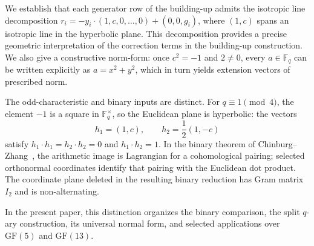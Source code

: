 \documentclass[12pt]{article}
\newcommand{\F}{\mathbb{F}}
\newcommand{\GF}[1]{\ensuremath{\mathrm{GF}(#1)}}
\begin{document}

We establish that each generator row of the building-up admits the isotropic line decomposition $r_i = -y_i \cdot (1, c, 0, \ldots, 0) + (0, 0, g_i)$, where $(1, c)$ spans an isotropic line in the hyperbolic plane. This decomposition provides a precise geometric interpretation of the correction terms in the building-up construction. We also give a constructive norm-form: once $c^2=-1$ and $2\neq 0$, every $a\in\F_q$ can be written explicitly as $a=x^2+y^2$, which in turn yields extension vectors of prescribed norm.

The odd-characteristic and binary inputs are distinct. For
\(q\equiv1\pmod4\), the element \(-1\) is a square in \(\F_q^\times\), so
the Euclidean plane is hyperbolic: the vectors
\[
h_1=(1,c),\qquad h_2=\frac12(1,-c)
\]
satisfy \(h_1\cdot h_1=h_2\cdot h_2=0\) and
\(h_1\cdot h_2=1\). In the binary theorem of
Chinburg--Zhang~\cite{ChinburgZhang}, the arithmetic image is Lagrangian for
a cohomological pairing; selected orthonormal coordinates identify that
pairing with the Euclidean dot product. The coordinate plane deleted in the
resulting binary reduction has Gram matrix \(I_2\) and is non-alternating.

In the present paper, this distinction organizes the binary comparison, the
split \(q\)-ary construction, its universal normal form, and selected
applications over \(\GF{5}\) and \(\GF{13}\).
\end{document}
